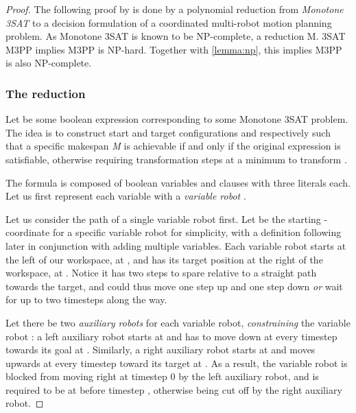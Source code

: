 \begin{proof}
	The following proof by \cite{siamcomp/DemaineFKMS19} is done by a polynomial reduction from \emph{Monotone 3SAT} to a decision formulation of a coordinated multi-robot motion planning problem. As Monotone 3SAT is known to be NP-complete, a reduction M. 3SAT  M3PP implies M3PP is NP-hard. Together with \cref{lemma:np}, this implies M3PP is also NP-complete. 

	\subsubsection*{The reduction} 
	Let \ilmath{\varphi} be some boolean expression corresponding to some Monotone 3SAT problem. The idea is to construct start and target configurations  and  respectively such that a specific makespan \emph{M} is achievable if and only if the original expression \ilmath{\varphi} is satisfiable, otherwise requiring  transformation steps at a minimum to transform .


	The formula \ilmath{\varphi} is composed of  boolean variables  and  clauses  with three literals each. Let us first represent each variable  with a \emph{variable robot} .

	Let us consider the path of a single variable robot  first. Let  be the starting -coordinate for a specific variable robot  for simplicity, with a definition following later in conjunction with adding multiple variables. Each variable robot starts at the left of our workspace, at , and has its target position at the right of the workspace, at . Notice it has two steps to spare relative to a straight path towards the target, and could thus move one step up and one step down \emph{or} wait for up to two timesteps along the way.

	Let there be two \emph{auxiliary robots} for each variable robot, \emph{constraining} the variable robot : a left auxiliary robot starts at  and has to move down at every timestep towards its goal at . Similarly, a right auxiliary robot starts at  and moves upwards at every timestep toward its target at . As a result, the variable robot  is blocked from moving right at timestep 0 by the left auxiliary robot, and is required to be at  before timestep , otherwise being cut off by the right auxiliary robot.


\end{proof}

